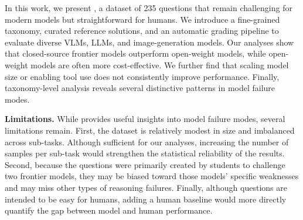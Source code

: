 In this work, we present \bench, a dataset of 235 questions that remain challenging for modern models but straightforward for humans. We introduce a fine-grained taxonomy, curated reference solutions, and an automatic grading pipeline to evaluate diverse VLMs, LLMs, and image-generation models. Our analyses show that closed-source frontier models outperform open-weight models, while open-weight models are often more cost-effective. We further find that scaling model size or enabling tool use does not consistently improve performance. Finally, taxonomy-level analysis reveals several distinctive patterns in model failure modes.


\textbf{Limitations.}
While \bench provides useful insights into model failure modes, several limitations remain. First, the dataset is relatively modest in size and imbalanced across sub-tasks. Although sufficient for our analyses, increasing the number of samples per sub-task would strengthen the statistical reliability of the results. Second, because the questions were primarily created by students to challenge two frontier models, they may be biased toward those models' specific weaknesses and may miss other types of reasoning failures. Finally, although \bench questions are intended to be easy for humans, adding a human baseline would more directly quantify the gap between model and human performance.

